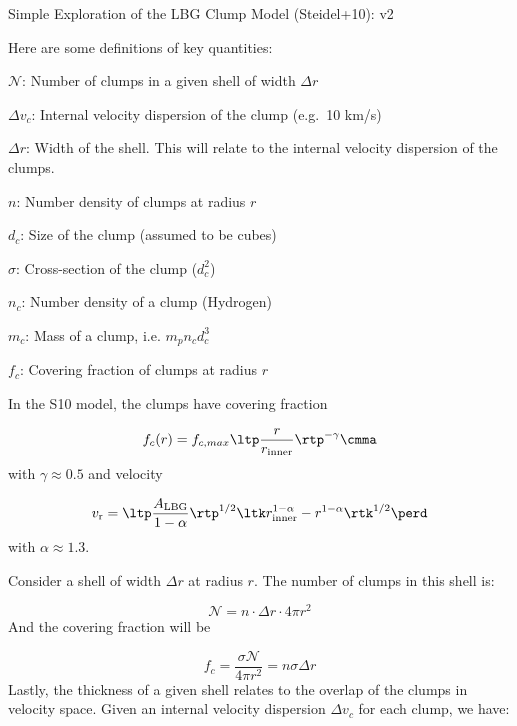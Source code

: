 \documentclass[12pt,letterpaper]{article}
\newcommand{\nc}{$\mathcal{N}$}
\newcommand{\mnc}{\mathcal{N}}
\newcommand{\mvr}{v_{\rm r}}
\newenvironment{my_itemize}{
\begin{itemize}
  \setlength{\itemsep}{1pt}
  \setlength{\parskip}{0pt}
  \setlength{\parsep}{0pt}}{\end{itemize}
}
\begin{document}
\begin{center}
{\Large Simple Exploration of the LBG Clump Model (Steidel+10): v2}
\end{center}

Here are some definitions of key quantities: 

\begin{my_itemize}
\item \nc: Number of clumps in a given shell of width $\Delta r$
\item $\Delta v_c$: Internal velocity dispersion of the clump (e.g.\
  10 km/s)
\item $\Delta r$: Width of the shell. This will relate to the internal
  velocity dispersion of the clumps.
\item $n$: Number density of clumps at radius $r$
\item $d_c$: Size of the clump (assumed to be cubes)
\item $\sigma$: Cross-section of the clump ($d_c^2$)
\item $n_c$: Number density of a clump (Hydrogen)
\item $m_c$: Mass of a clump, i.e. $m_p n_c d_c^3$
\item $f_c$: Covering fraction of clumps at radius $r$
\end{my_itemize}

In the S10 model, the clumps have covering fraction

\begin{equation}
f_c(r) = f_{c,max} \ltp \frac{r}{r_{\rm inner}} \rtp^{-\gamma} \cmma
\label{eqn:covering}
\end{equation}
with $\gamma \approx 0.5$ and velocity

\begin{equation}
\mvr = \ltp \frac{A_{\rm LBG}}{1-\alpha} \rtp^{1/2} \ltk r_{\rm
  inner}^{1-\alpha} - r^{1-\alpha} \rtk^{1/2} \perd
\label{eqn:LBG_vlaw}
\end{equation}
with $\alpha \approx 1.3$.

Consider a shell of width $\Delta r$ at radius $r$.   The number of
clumps in this shell is:

\begin{equation}
\mnc = n \cdot \Delta r \cdot 4 \pi r^2
\end{equation}
And the covering fraction will be

\begin{equation}
f_c = \frac{\sigma \mnc}{4 \pi r^2} = n \sigma \Delta r
\end{equation}
Lastly, the thickness of a given shell relates to the overlap of the
clumps in velocity space.  Given an internal velocity dispersion $\Delta
v_c$ for each clump, we have:
\end{document}
